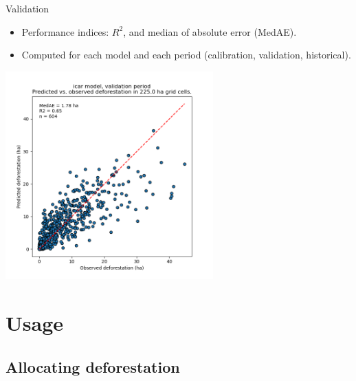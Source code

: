 \documentclass[10pt,table,dvipsnames,compress]{beamer}
\begin{document}
\begin{frame}[label={sec:org3609995}]{Validation}
\begin{itemize}
\item Performance indices: \(R^2\), and median of absolute error (MedAE).
\item Computed for each model and each period (calibration, validation, historical).
\end{itemize}

\begin{center}
\includegraphics[width=0.6\textwidth]{figs/get_started/pred_obs_icar_validation_50.png}
\end{center}
\end{frame}

\section{Usage}
\label{sec:org3edfc8e}

\subsection{Allocating deforestation}
\label{sec:org9fb3dab}
\end{document}
